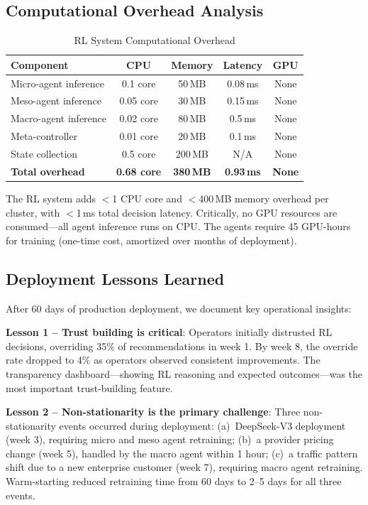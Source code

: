 \documentclass[conference,10pt]{IEEEtran}
\begin{document}
\subsection{Computational Overhead Analysis}

\begin{table}[!htbp]
\caption{RL System Computational Overhead}
\label{tab:overhead}
\centering\scriptsize
\begin{tabular}{@{}lcccc@{}}
\toprule
\textbf{Component} & \textbf{CPU} & \textbf{Memory} & \textbf{Latency} & \textbf{GPU} \\
\midrule
Micro-agent inference & 0.1 core & 50\,MB & 0.08\,ms & None \\
Meso-agent inference & 0.05 core & 30\,MB & 0.15\,ms & None \\
Macro-agent inference & 0.02 core & 80\,MB & 0.5\,ms & None \\
Meta-controller & 0.01 core & 20\,MB & 0.1\,ms & None \\
State collection & 0.5 core & 200\,MB & N/A & None \\
\midrule
\textbf{Total overhead} & \textbf{0.68 core} & \textbf{380\,MB} & \textbf{0.93\,ms} & \textbf{None} \\
\bottomrule
\end{tabular}
\end{table}

The RL system adds $<$1 CPU core and $<$400\,MB memory overhead per cluster, with $<$1\,ms total decision latency. Critically, no GPU resources are consumed---all agent inference runs on CPU. The agents require 45 GPU-hours for training (one-time cost, amortized over months of deployment).

\subsection{Deployment Lessons Learned}

After 60 days of production deployment, we document key operational insights:

\textbf{Lesson 1 -- Trust building is critical}: Operators initially distrusted RL decisions, overriding 35\% of recommendations in week 1. By week 8, the override rate dropped to 4\% as operators observed consistent improvements. The transparency dashboard---showing RL reasoning and expected outcomes---was the most important trust-building feature.

\textbf{Lesson 2 -- Non-stationarity is the primary challenge}: Three non-stationarity events occurred during deployment: (a)~DeepSeek-V3 deployment (week 3), requiring micro and meso agent retraining; (b)~a provider pricing change (week 5), handled by the macro agent within 1 hour; (c)~a traffic pattern shift due to a new enterprise customer (week 7), requiring macro agent retraining. Warm-starting reduced retraining time from 60 days to 2--5 days for all three events.
\end{document}
